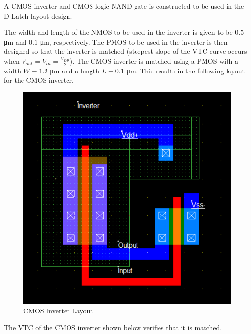 
A CMOS inverter and CMOS logic NAND gate is constructed to be used in the D Latch layout design.

The width and length of the NMOS to be used in the inverter is given to be $0.5$ \si{\micro\meter} and $0.1$ \si{\micro\meter}, respectively.
The PMOS to be used in the inverter is then designed so that the inverter is matched (steepest slope of the VTC curve occurs when $V_{out} = V_{in} = \frac{V_{DD}}{2}$).
The CMOS inverter is matched using a PMOS with a width $W = 1.2$ \si{\micro\meter} and a length $L = 0.1$ \si{\micro\meter}.
This results in the following layout for the CMOS inverter.

\FloatBarrier

\begin{figure}[h!]
	\centering
	\includegraphics[scale=0.40]{../images/inverter_layout.PNG}
	\caption{CMOS Inverter Layout}
	\label{fig:inverter_layout}
\end{figure}

\FloatBarrier

The VTC of the CMOS inverter shown below verifies that it is matched.

\FloatBarrier

